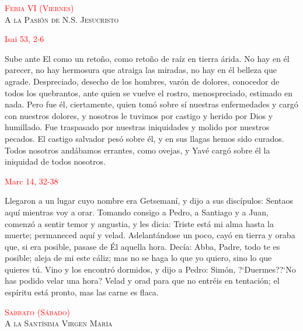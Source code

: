 \documentclass[10pt]{article}
\begin{document}
\begin{multicols}{2}
      \begin{center}
            \textsc{\textcolor{red}{Feria VI (Viernes)}\\ {\large A la Pasión de N.S. Jesucristo}}
      \end{center}

      \hfill\textcolor{red}{Isai 53, 2-6}

      Sube ante El como un retoño, como retoño de raíz en tierra árida. No hay en él parecer, no hay hermosura que atraiga las miradas, no hay en él belleza que agrade. Despreciado, 
      desecho de los hombres, varón de dolores, conocedor de todos los quebrantos, ante quien se vuelve el rostro, menospreciado, estimado en nada. Pero fue él, ciertamente, quien tomó 
      sobre sí nuestras enfermedades y cargó con nuestros dolores, y nosotros le tuvimos por castigo y herido por Dios y humillado. Fue traspasado por nuestras iniquidades y molido por 
      nuestros pecados. El castigo salvador pesó sobre él, y en sus llagas hemos sido curados. Todos nosotros andábamos errantes, como ovejas, y Yavé cargó sobre él la iniquidad de 
      todos nosotros.\newline

      \hfill\textcolor{red}{Marc 14, 32-38}

      Llegaron a un lugar cuyo nombre era Getsemaní, y dijo a sus discípulos: Sentaos aquí mientras voy a orar. Tomando consigo a Pedro, a Santiago y a Juan, comenzó a sentir temor y angustia,
      y les dicia: Triste está mi alma hasta la muerte; permaneced aquí y velad. Adelantándose un poco, cayó en tierra y oraba que, si era posible, pasase de Él aquella hora. Decía: Abba, Padre,
      todo te es posible; aleja de mi este cáliz; mas no se haga lo que yo quiero, sino lo que quieres tú. Vino y los encontró dormidos, y dijo a Pedro: Simón, {?`}Duermes?{?`}No has podido
      velar una hora? Velad y orad para que no entréis en tentación; el espíritu está pronto, mas las carne es flaca.\newline

      \begin{otherlanguage}{latin}
            

            

            
      \end{otherlanguage}

      \begin{center}
            \noindent\textsc{\textcolor{red}{Sabbato (Sábado)}\\ {\large A la Santísima Virgen María}}
      \end{center}


\end{multicols}
\end{document}
